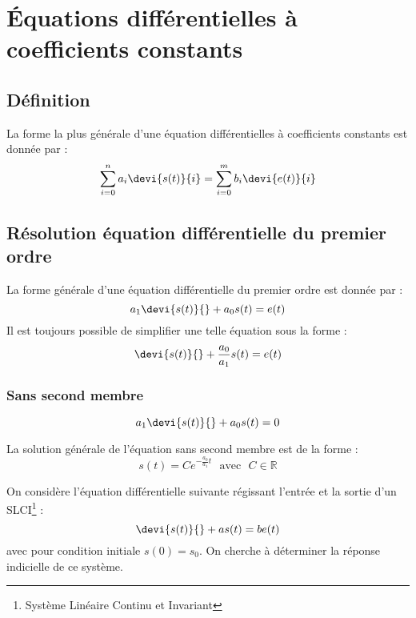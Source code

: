 \chapter{Équations différentielles à coefficients constants\label{annexe-eqndiff}}

\section{Définition}
La forme la plus générale d'une équation différentielles à coefficients constants est donnée
par :
\begin{align}
\sum_{i=0}^{n}a_i\devi{s(t)}{i}=\sum_{i=0}^{m}b_i\devi{e(t)}{i}
\end{align}


\section{Résolution équation différentielle du premier ordre}

La forme générale d'une équation différentielle du premier ordre est
donnée par : 
$$
a_1\devi{s(t)}{}+a_0s(t)=e(t)
$$
Il est toujours possible de simplifier une telle équation sous la forme :
$$
\devi{s(t)}{}+\dfrac{a_0}{a_1}s(t)=e(t)
$$


\subsection{Sans second membre}
$$
a_1\devi{s(t)}{}+a_0s(t)=0
$$

La solution générale de l'équation sans second membre est de la forme :
$$
s(t) = C e^{-\frac{a_0}{a_1}t}\,\,\,\,\text{avec}\,\,\,\,C\in\mathbb{R}
$$

On considère l'équation différentielle suivante régissant l'entrée                                                                        
et la sortie d'un SLCI\footnote{Système Linéaire Continu et Invariant} :                                                                  
$$                                                                                                                                        
\devi{s(t)}{}+as(t)=be(t)                                                                                                                 
$$                                                                                                                                        
avec pour condition initiale $s(0)=s_0$.                                                                                                  
On cherche à déterminer la réponse indicielle de ce système.                                                                              
                                                                                                                                          
